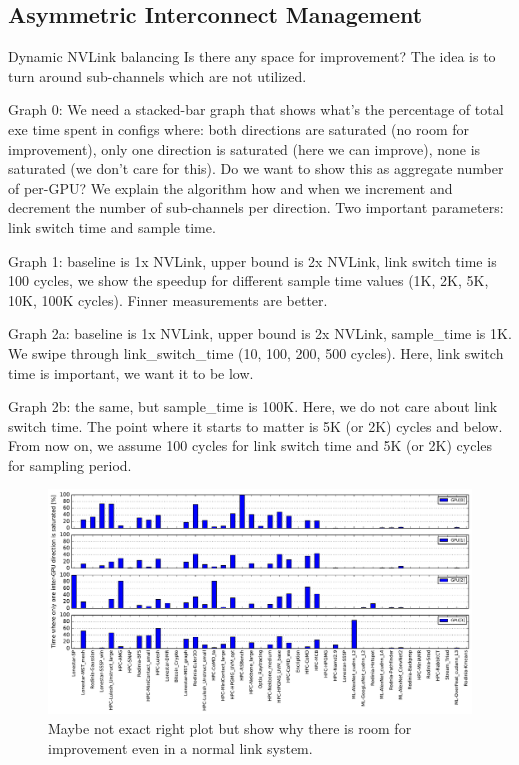 \subsection{Asymmetric Interconnect Management}
\label{interconnect}

Dynamic NVLink balancing Is there any space for improvement? The idea is to turn 
around sub-channels which are not utilized. 

Graph 0: We need a stacked-bar graph that shows what’s the percentage of total 
exe time spent in configs where: both directions are saturated (no room for 
improvement), only one direction is saturated (here we can improve), none is 
saturated (we don’t care for this). Do we want to show this as aggregate number 
of per-GPU?
We explain the algorithm how and when we increment and decrement the number of 
sub-channels per direction. Two important parameters: link switch time and 
sample time.

Graph 1: baseline is 1x NVLink, upper bound is 2x NVLink, link switch time is 
100 cycles, we show the speedup for different sample time values (1K, 2K, 5K, 
10K, 100K cycles). Finner measurements are better.

Graph 2a: baseline is 1x NVLink, upper bound is 2x NVLink, sample\_time is 1K. 
We swipe through link\_switch\_time (10, 100, 200, 500 cycles). Here, link 
switch time is important, we want it to be low.

Graph 2b: the same, but sample\_time is 100K. Here, we do not care about link 
switch time. The point where it starts to matter is 5K (or 2K) cycles and below. 
From now on, we assume 100 cycles for link switch time and 5K (or 2K) cycles for 
sampling period.

\begin{figure}[tp]
    \centering
    \includegraphics[width=0.9\columnwidth]{figures/plot_nvlink_chance.pdf}
    \caption{Maybe not exact right plot but show why there is room for 
improvement even in a normal link system.}
    \label{fig:link-motivation}
\end{figure}


